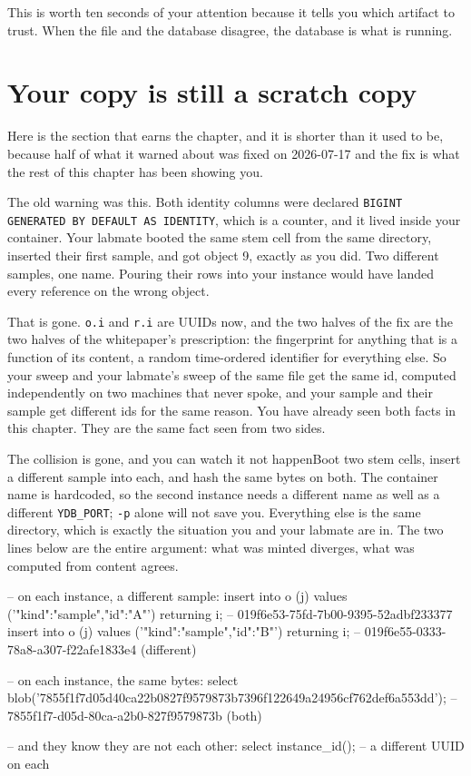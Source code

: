 This is worth ten seconds of your attention because it tells you which artifact to trust. When the file and the database disagree, the database is what is running.

\section{Your copy is still a scratch copy}

Here is the section that earns the chapter, and it is shorter than it used to be, because half of what it warned about was fixed on 2026-07-17 and the fix is what the rest of this chapter has been showing you.

The old warning was this. Both identity columns were declared \verb|BIGINT GENERATED BY DEFAULT AS IDENTITY|, which is a counter, and it lived inside your container. Your labmate booted the same stem cell from the same directory, inserted their first sample, and got object 9, exactly as you did. Two different samples, one name. Pouring their rows into your instance would have landed every reference on the wrong object.

That is gone. \verb|o.i| and \verb|r.i| are UUIDs now, and the two halves of the fix are the two halves of the whitepaper's prescription: the fingerprint for anything that is a function of its content, a random time-ordered identifier for everything else. So your sweep and your labmate's sweep of the same file get the same id, computed independently on two machines that never spoke, and your sample and their sample get different ids for the same reason. You have already seen both facts in this chapter. They are the same fact seen from two sides.

\begin{Correspondence}{The collision is gone, and you can watch it not happen}{Boot two stem cells, insert a different sample into each, and hash the same bytes on both.}
The container name is hardcoded, so the second instance needs a different name as well as a different \texttt{YDB\_PORT}; \texttt{-p} alone will not save you. Everything else is the same directory, which is exactly the situation you and your labmate are in. The two lines below are the entire argument: what was minted diverges, what was computed from content agrees.
\begin{Check}
-- on each instance, a different sample:
insert into o (j) values ('{"kind":"sample","id":"A"}') returning i;
                             -- 019f6e53-75fd-7b00-9395-52adbf233377
insert into o (j) values ('{"kind":"sample","id":"B"}') returning i;
                             -- 019f6e55-0333-78a8-a307-f22afe1833e4  (different)

-- on each instance, the same bytes:
select blob('7855f1f7d05d40ca22b0827f9579873b7396f122649a24956cf762def6a553dd');
                             -- 7855f1f7-d05d-80ca-a2b0-827f9579873b  (both)

-- and they know they are not each other:
select instance_id();        -- a different UUID on each
\end{Check}
\end{Correspondence}


